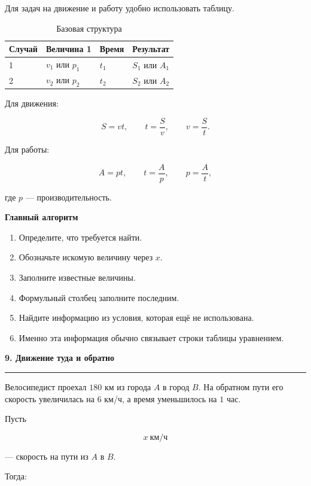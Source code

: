 \documentclass[a4paper,12pt]{article}
\newcommand{\topic}[1]{%
    \vspace{0.5em}
    {\Large\bfseries\textcolor{darkaccent}{#1}}\par
    \vspace{0.2em}
    {\color{accent}\rule{\linewidth}{0.7pt}}
    \vspace{0.5em}
}
\newcommand{\subtopic}[1]{%
    \vspace{0.5em}
    {\large\bfseries\textcolor{darkaccent}{#1}}\par
}
\begin{document}
Для задач на движение и работу удобно использовать таблицу.

\begin{table}[h]
\centering
\caption{Базовая структура}
\renewcommand{\arraystretch}{1.35}
\begin{tabularx}{0.85\linewidth}{@{}lXXX@{}}
\toprule
Случай & Величина 1 & Время & Результат \\
\midrule
1 & \(v_1\) или \(p_1\) & \(t_1\) & \(S_1\) или \(A_1\) \\
2 & \(v_2\) или \(p_2\) & \(t_2\) & \(S_2\) или \(A_2\) \\
\bottomrule
\end{tabularx}
\end{table}

Для движения:

\[
S=vt,
\qquad
t=\frac{S}{v},
\qquad
v=\frac{S}{t}.
\]

Для работы:

\[
A=pt,
\qquad
t=\frac{A}{p},
\qquad
p=\frac{A}{t},
\]

где \(p\) --- производительность.

\subtopic{Главный алгоритм}

\begin{enumerate}
    \item Определите, что требуется найти.
    \item Обозначьте искомую величину через \(x\).
    \item Заполните известные величины.
    \item Формульный столбец заполните последним.
    \item Найдите информацию из условия, которая ещё не использована.
    \item Именно эта информация обычно связывает строки таблицы уравнением.
\end{enumerate}


\topic{9. Движение туда и обратно}

Велосипедист проехал \(180\) км из города \(A\) в город \(B\). На обратном пути его скорость увеличилась на \(6\) км/ч, а время уменьшилось на \(1\) час.

Пусть

\[
x\ \text{км/ч}
\]

--- скорость на пути из \(A\) в \(B\).

Тогда:
\end{document}
